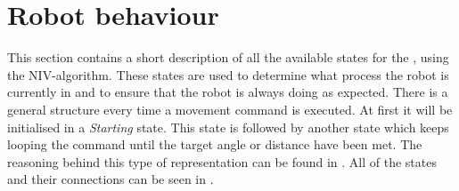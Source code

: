 \section{Robot behaviour} \label{sec:robot_behaviour}

This section contains a short description of all the available states for the \projname{}, using the NIV-algorithm. These states are used to determine what process the robot is currently in and to ensure that the robot is always doing as expected. There is a general structure every time a movement command is executed. At first it will be initialised in a \emph{Starting} state. This state is followed by another state which keeps looping the command until the target angle or distance have been met. The reasoning behind this type of representation can be found in . All of the states and their connections can be seen in .

